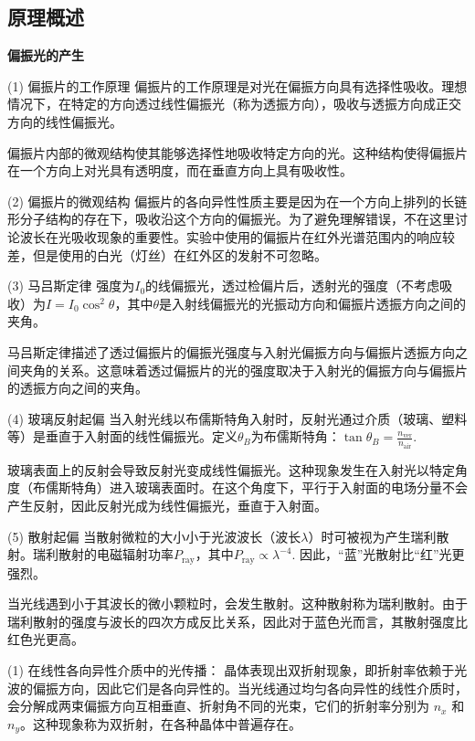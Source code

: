 \documentclass[dvipsnames, svgnames,a4paper,11pt]{article}
\begin{document}
	\subsection{原理概述}
{ \textbf{\large {偏振光的产生}} }

(1) 偏振片的工作原理
偏振片的工作原理是对光在偏振方向具有选择性吸收。理想情况下，在特定的方向透过线性偏振光（称为透振方向），吸收与透振方向成正交方向的线性偏振光。

偏振片内部的微观结构使其能够选择性地吸收特定方向的光。这种结构使得偏振片在一个方向上对光具有透明度，而在垂直方向上具有吸收性。

(2) 偏振片的微观结构
偏振片的各向异性性质主要是因为在一个方向上排列的长链形分子结构的存在下，吸收沿这个方向的偏振光。为了避免理解错误，不在这里讨论波长在光吸收现象的重要性。实验中使用的偏振片在红外光谱范围内的响应较差，但是使用的白光（灯丝）在红外区的发射不可忽略。

(3) 马吕斯定律
强度为$I_0$的线偏振光，透过检偏片后，透射光的强度（不考虑吸收）为$I = I_0\cos^2\theta$，其中$\theta$是入射线偏振光的光振动方向和偏振片透振方向之间的夹角。

马吕斯定律描述了透过偏振片的偏振光强度与入射光偏振方向与偏振片透振方向之间夹角的关系。这意味着透过偏振片的光的强度取决于入射光的偏振方向与偏振片的透振方向之间的夹角。

(4) 玻璃反射起偏
当入射光线以布儒斯特角入射时，反射光通过介质（玻璃、塑料等）是垂直于入射面的线性偏振光。定义$\theta_B$为布儒斯特角：$\tan\theta_B = \frac{n_{\text{ver}}}{n_{\text{air}}}.$ 

玻璃表面上的反射会导致反射光变成线性偏振光。这种现象发生在入射光以特定角度（布儒斯特角）进入玻璃表面时。在这个角度下，平行于入射面的电场分量不会产生反射，因此反射光成为线性偏振光，垂直于入射面。

(5) 散射起偏
当散射微粒的大小小于光波波长（波长$\lambda$）时可被视为产生瑞利散射。瑞利散射的电磁辐射功率$P_{\text{ray}}$，其中$P_{\text{ray}} \propto \lambda^{-4}$. 因此，“蓝”光散射比“红”光更强烈。

当光线遇到小于其波长的微小颗粒时，会发生散射。这种散射称为瑞利散射。由于瑞利散射的强度与波长的四次方成反比关系，因此对于蓝色光而言，其散射强度比红色光更高。\\

(1) 在线性各向异性介质中的光传播：
晶体表现出双折射现象，即折射率依赖于光波的偏振方向，因此它们是各向异性的。当光线通过均匀各向异性的线性介质时，会分解成两束偏振方向互相垂直、折射角不同的光束，它们的折射率分别为 $n_x$ 和 $n_y$。这种现象称为双折射，在各种晶体中普遍存在。
\end{document}
